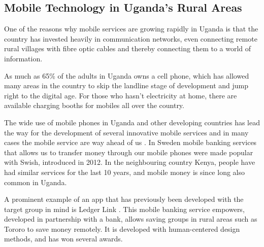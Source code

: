 \subsection{Mobile Technology in Uganda's Rural Areas}\label{sec:mobile-uganda}

One of the reasons why mobile services are growing rapidly in Uganda is that the country has invested heavily in communication networks, even connecting remote rural villages with fibre optic cables and thereby connecting them to a world of information.

As much as 65\% of the adults in Uganda owns a cell phone, which has allowed many areas in the country to skip the landline stage of development and jump right to the digital age. For those who hasn’t electricity at home, there are available charging booths for mobiles all over the country.

The wide use of mobile phones in Uganda and other developing countries has lead the way for the development of several innovative mobile services and in many cases the mobile service are way ahead of us  \citep{nissar}. In Sweden mobile banking services that allows us to transfer money through our mobile phones were made popular with Swish, introduced in 2012. In the neighbouring country Kenya, people have had similar services for the last 10 years, and mobile money is since long also common in Uganda.

A prominent example of an app that has previously been developed with the target group in mind is Ledger Link \citep{ledgerlink}. This mobile banking service empowers, developed in partnership with a bank, allows saving groups in rural areas such as Tororo to save money remotely. It is developed with human-centered design methods, and has won several awards.


%
